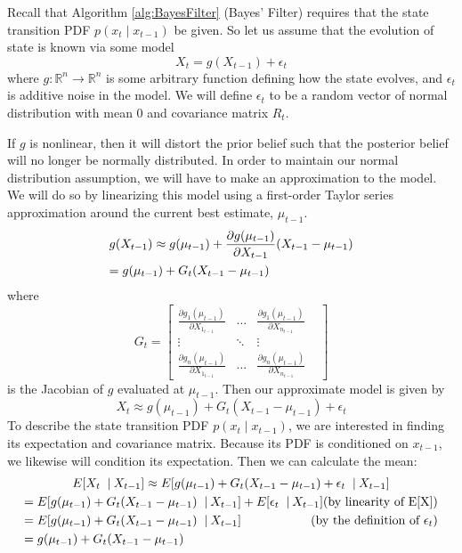 Recall that Algorithm \ref{alg:BayesFilter} (Bayes' Filter) requires that the state transition PDF \(p(x_t \mathbin{\vert} x_{t-1})\) be given. So let us assume that the evolution of state is known via some model \[X_t =  g(X_{t-1}) + \epsilon_t\] where \(g: \mathbb{R}^n \to \mathbb{R}^n\) is some arbitrary function defining how the state evolves, and \(\epsilon_t\) is additive noise in the model. We will define \(\epsilon_t\) to be a random vector of normal distribution with mean 0 and covariance matrix \(R_t\).

If \(g\) is nonlinear, then it will distort the prior belief such that the posterior belief will no longer be normally distributed. In order to maintain our normal distribution assumption, we will have to make an approximation to the model. We will do so by linearizing this model using a first-order Taylor series approximation around the current best estimate, \(\mu_{t-1}\).
\begin{multline*}
g(X_{t-1}) \approx g(\mu_{t-1}) + \frac{\partial g(\mu_{t-1})}{\partial X_{t-1}} (X_{t-1} - \mu_{t-1}) \\
= g(\mu_{t-1}) + G_t (X_{t-1} - \mu_{t-1}) \hfill
\end{multline*}
where \[
G_t = \begin{bmatrix} 
\frac{\partial g_1(\mu_{t-1})}{\partial X_{1_{t-1}}} & \dots & \frac{\partial g_1(\mu_{t-1})}{\partial X_{n_{t-1}}}\\
\vdots & \ddots & \vdots & \\
\frac{\partial g_n(\mu_{t-1})}{\partial X_{1_{t-1}}} & \dots & \frac{\partial g_n(\mu_{t-1})}{\partial X_{n_{t-1}}} 
\end{bmatrix} \] is the Jacobian of \(g\) evaluated at \(\mu_{t-1}\). Then our approximate model is given by
\begin{equation*}
X_t \approx g(\mu_{t-1}) + G_t (X_{t-1} - \mu_{t-1}) + \epsilon_t
\end{equation*}
To describe the state transition PDF \(p(x_t \mathbin{\vert} x_{t-1})\), we are interested in finding its expectation and covariance matrix. Because its PDF is conditioned on \(x_{t-1}\), we likewise will condition its expectation. Then we can calculate the mean:
\begin{multline*}
E[X_t\ \mathbin{\vert} X_{t-1}] \approx E[g(\mu_{t-1}) + G_t (X_{t-1} - \mu_{t-1}) + \epsilon_t\ \mathbin{\vert} X_{t-1}] \\
= E[g(\mu_{t-1}) + G_t (X_{t-1} - \mu_{t-1})\ \mathbin{\vert} X_{t-1}] + E[\epsilon_t\ \mathbin{\vert} X_{t-1}] \hfill \text{(by linearity of E[X])} \\
= E[g(\mu_{t-1}) + G_t (X_{t-1} - \mu_{t-1})\ \mathbin{\vert} X_{t-1}] \hfill \text{(by the definition of \(\epsilon_t\))} \\
= g(\mu_{t-1}) + G_t (X_{t-1} - \mu_{t-1}) \hfill
\end{multline*}

